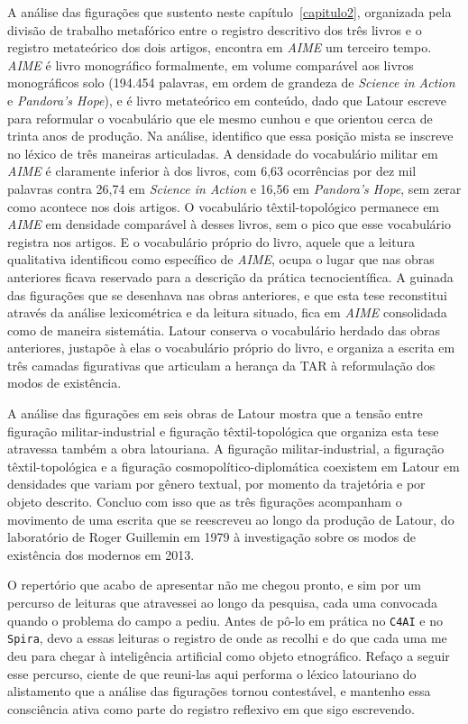 A análise das figurações que sustento neste capítulo~\ref{capitulo2}, organizada pela divisão de trabalho metafórico entre o registro descritivo dos três livros e o registro metateórico dos dois artigos, encontra em \textit{AIME} um terceiro tempo. \textit{AIME} é livro monográfico formalmente, em volume comparável aos livros monográficos solo (194.454 palavras, em ordem de grandeza de \emph{Science in Action} e \emph{Pandora's Hope}), e é livro metateórico em conteúdo, dado que Latour escreve para reformular o vocabulário que ele mesmo cunhou e que orientou cerca de trinta anos de produção. Na análise, identifico que essa posição mista se inscreve no léxico de três maneiras articuladas. A densidade do vocabulário militar em \textit{AIME} é claramente inferior à dos livros, com 6,63 ocorrências por dez mil palavras contra 26,74 em \emph{Science in Action} e 16,56 em \emph{Pandora's Hope}, sem zerar como acontece nos dois artigos. O vocabulário têxtil-topológico permanece em \textit{AIME} em densidade comparável à desses livros, sem o pico que esse vocabulário registra nos artigos. E o vocabulário próprio do livro, aquele que a leitura qualitativa identificou como específico de \textit{AIME}, ocupa o lugar que nas obras anteriores ficava reservado para a descrição da prática tecnocientífica. A guinada das figurações que se desenhava nas obras anteriores, e que esta tese reconstitui através da análise lexicométrica e da leitura situado, fica em \textit{AIME} consolidada como de maneira sistemátia. Latour conserva o vocabulário herdado das obras anteriores, justapõe à elas o vocabulário próprio do livro, e organiza a escrita em três camadas figurativas que articulam a herança da TAR à reformulação dos modos de existência.

A análise das figurações em seis obras de Latour mostra que a tensão entre figuração militar-industrial e figuração têxtil-topológica que organiza esta tese atravessa também a obra latouriana. A figuração militar-industrial, a figuração têxtil-topológica e a figuração cosmopolítico-diplomática coexistem em Latour em densidades que variam por gênero textual, por momento da trajetória e por objeto descrito. Concluo com isso que as três figurações acompanham o movimento de uma escrita que se reescreveu ao longo da produção de Latour, do laboratório de Roger Guillemin em 1979 à investigação sobre os modos de existência dos modernos em 2013.

O repertório que acabo de apresentar não me chegou pronto, e sim por um percurso de leituras que atravessei ao longo da pesquisa, cada uma convocada quando o problema do campo a pediu. Antes de pô-lo em prática no \texttt{C4AI} e no \texttt{Spira}, devo a essas leituras o registro de onde as recolhi e do que cada uma me deu para chegar à inteligência artificial como objeto etnográfico. Refaço a seguir esse percurso, ciente de que reuni-las aqui performa o léxico latouriano do alistamento que a análise das figurações tornou contestável, e mantenho essa consciência ativa como parte do registro reflexivo em que sigo escrevendo.


